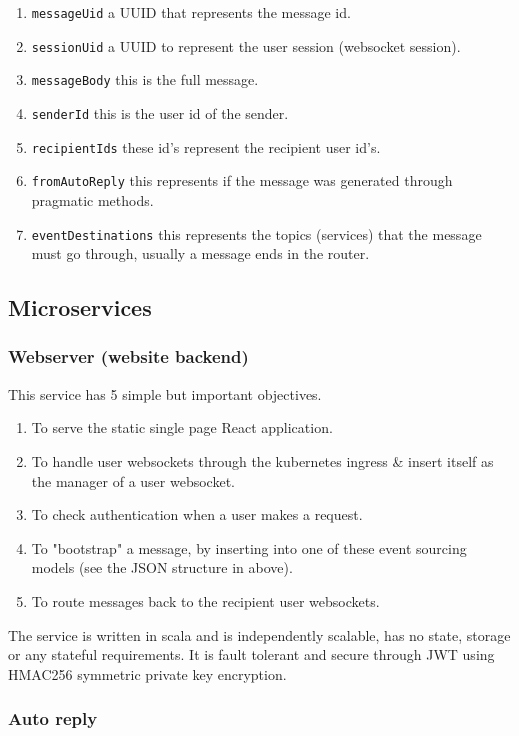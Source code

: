 \begin{enumerate}
    \item \texttt{messageUid} a UUID that represents the message id.
    \item \texttt{sessionUid} a UUID to represent the user session (websocket session).
    \item \texttt{messageBody} this is the full message.
    \item \texttt{senderId} this is the user id of the sender.
    \item \texttt{recipientIds} these id's represent the recipient user id's.
    \item \texttt{fromAutoReply} this represents if the message was generated through pragmatic methods.
    \item \texttt{eventDestinations} this represents the topics (services) that the message must go through, usually a message ends in the router.
\end{enumerate}

\subsection{Microservices}
\subsubsection{Webserver (website backend)}
This service has 5 simple but important objectives.
\begin{enumerate}
    \item To serve the static single page React application.
    \item To handle user websockets through the kubernetes ingress \& insert itself as the manager of a user websocket.
    \item To check authentication when a user makes a request.
    \item To "bootstrap" a message, by inserting into one of these event sourcing models (see the JSON structure in above).
    \item To route messages back to the recipient user websockets.
\end{enumerate}
The service is written in scala and is independently scalable, has no state, storage or any stateful requirements.
It is fault tolerant and secure through JWT using HMAC256 symmetric private key encryption.
\subsubsection{Auto reply}
